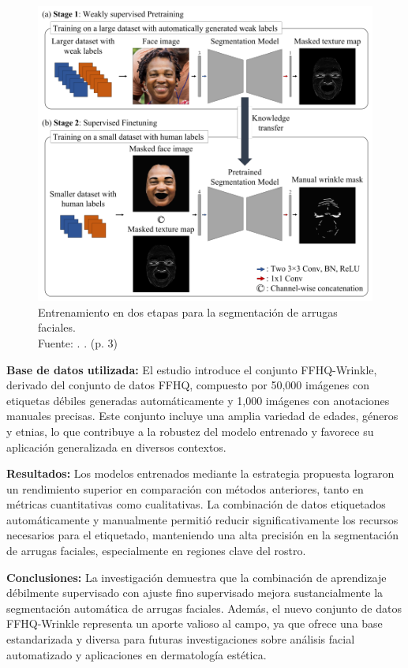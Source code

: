 \begin{figure}[!ht]
	\begin{center}
		\includegraphics[width=1\textwidth]{2/figures/metoart9.png}
		\caption[Entrenamiento en dos etapas para la segmentación de arrugas faciales]{Entrenamiento en dos etapas para la segmentación de arrugas faciales.\\
			Fuente: \cite{moon2024dermatology}. . (p. 3)}
		\label{2:fig11}
	\end{center}
\end{figure}

\textbf{Base de datos utilizada:}
El estudio introduce el conjunto FFHQ-Wrinkle, derivado del conjunto de datos FFHQ, compuesto por 50,000 imágenes con etiquetas débiles generadas automáticamente y 1,000 imágenes con anotaciones manuales precisas. Este conjunto incluye una amplia variedad de edades, géneros y etnias, lo que contribuye a la robustez del modelo entrenado y favorece su aplicación generalizada en diversos contextos.

\textbf{Resultados:}
Los modelos entrenados mediante la estrategia propuesta lograron un rendimiento superior en comparación con métodos anteriores, tanto en métricas cuantitativas como cualitativas. La combinación de datos etiquetados automáticamente y manualmente permitió reducir significativamente los recursos necesarios para el etiquetado, manteniendo una alta precisión en la segmentación de arrugas faciales, especialmente en regiones clave del rostro.

\textbf{Conclusiones:}
La investigación demuestra que la combinación de aprendizaje débilmente supervisado con ajuste fino supervisado mejora sustancialmente la segmentación automática de arrugas faciales. Además, el nuevo conjunto de datos FFHQ-Wrinkle representa un aporte valioso al campo, ya que ofrece una base estandarizada y diversa para futuras investigaciones sobre análisis facial automatizado y aplicaciones en dermatología estética.
